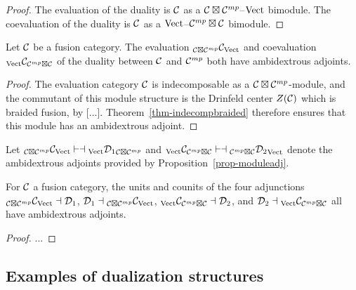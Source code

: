 \documentclass{amsart}
\begin{document}
\begin{proof}
The evaluation of the duality is $\mathcal C$ as a $\mathcal C \boxtimes \mathcal C^{mp}$--$\mathrm{Vect}$ bimodule.  The coevaluation of the duality is $\mathcal C$ as a $\mathrm{Vect}$--$\mathcal C^{mp} \boxtimes \mathcal C$ bimodule.
\end{proof}

\begin{proposition} \label{prop-moduleadj}
Let $\mathcal C$ be a fusion category.  The evaluation ${}_{\mathcal C \boxtimes \mathcal C^{mp}} {\mathcal C}_{\mathrm{Vect}}$ and coevaluation ${}_{\mathrm{Vect}} {\mathcal C}_{\mathcal C^{mp} \boxtimes \mathcal C}$ of the duality between $\mathcal C$ and $\mathcal C^{mp}$ both have ambidextrous adjoints.
\end{proposition}

\begin{proof}
The evaluation category $\mathcal C$ is indecomposable as a $\mathcal C \boxtimes \mathcal C^{mp}$-module, and the commutant of this module structure is the Drinfeld center $Z(\mathcal C)$ which is braided fusion, by [...].  Theorem~\ref{thm-indecompbraided} therefore ensures that this module has an ambidextrous adjoint.   
\end{proof}

Let ${}_{\mathcal C \boxtimes \mathcal C^{mp}} {\mathcal C}_{\mathrm{Vect}} \vdash \dashv {}_{\mathrm{Vect}} {\mathcal D_1}_{\mathcal C \boxtimes \mathcal C^{mp}}$ and ${}_{\mathrm{Vect}} {\mathcal C}_{\mathcal C^{mp} \boxtimes \mathcal C} \vdash \dashv {}_{\mathcal C^{mp} \boxtimes \mathcal C} {\mathcal D_2}_{\mathrm{Vect}}$ denote the ambidextrous adjoints provided by Proposition~\ref{prop-moduleadj}.

\begin{proposition}
For $\mathcal C$ a fusion category, the units and counits of the four adjunctions ${}_{\mathcal C \boxtimes \mathcal C^{mp}} {\mathcal C}_{\mathrm{Vect}} \dashv \mathcal D_1$, $\mathcal D_1 \dashv {}_{\mathcal C \boxtimes \mathcal C^{mp}} {\mathcal C}_{\mathrm{Vect}}$, ${}_{\mathrm{Vect}} {\mathcal C}_{\mathcal C^{mp} \boxtimes \mathcal C} \dashv \mathcal D_2$, and $\mathcal D_2 \dashv {}_{\mathrm{Vect}} {\mathcal C}_{\mathcal C^{mp} \boxtimes \mathcal C}$ all have ambidextrous adjoints.
\end{proposition}

\begin{proof}
...
\end{proof}


\subsection{Examples of dualization structures} \label{sec-df-examples}
\end{document}
